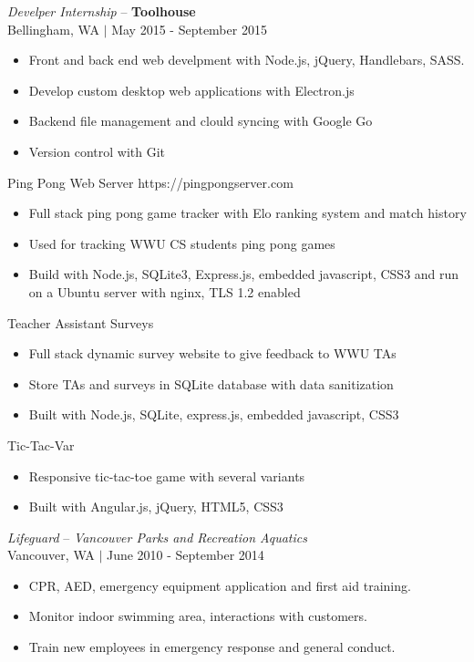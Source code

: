\documentclass[line,margin]{res}
\begin{document}
\begin{resume}
	{\sl Develper Internship} -- {\bf Toolhouse} \\
	{\footnotesize Bellingham, WA $|$  May 2015 - September 2015}
	\begin{itemize} \itemsep -2pt
		\item Front and back end web develpment with Node.js, jQuery, Handlebars, SASS.
		\item Develop custom desktop web applications with Electron.js
		\item Backend file management and clould syncing with Google Go
		\item Version control with Git
	\end{itemize}
	Ping Pong Web Server {\footnotesize https://pingpongserver.com}
\begin{itemize}\itemsep -2pt
		\item Full stack ping pong game tracker with Elo ranking system and match history
		\item Used for tracking WWU CS students ping pong games
		\item Build with Node.js, SQLite3, Express.js, embedded javascript, CSS3 and run on a Ubuntu server with nginx, TLS 1.2 enabled
	\end{itemize}
	Teacher Assistant Surveys
	\begin{itemize} \itemsep -2pt
		\item Full stack dynamic survey website to give feedback to WWU TAs
		\item Store TAs and surveys in SQLite database with data sanitization
		\item Built with Node.js, SQLite, express.js, embedded javascript, CSS3
	\end{itemize}
	Tic-Tac-Var
	\begin{itemize} \itemsep -2pt
		\item Responsive tic-tac-toe game with several variants
		\item Built with Angular.js, jQuery, HTML5, CSS3
	\end{itemize}

	{\sl Lifeguard} -- {\sl Vancouver Parks and Recreation Aquatics} \\
	{\footnotesize Vancouver, WA $|$  June 2010 - September 2014}
	\begin{itemize} \itemsep -2pt
		\item CPR, AED, emergency equipment application and first aid training.
		\item Monitor indoor swimming area, interactions with customers.
		\item Train new employees in emergency response and general conduct.
	\end{itemize}


\end{resume}
\end{document}
